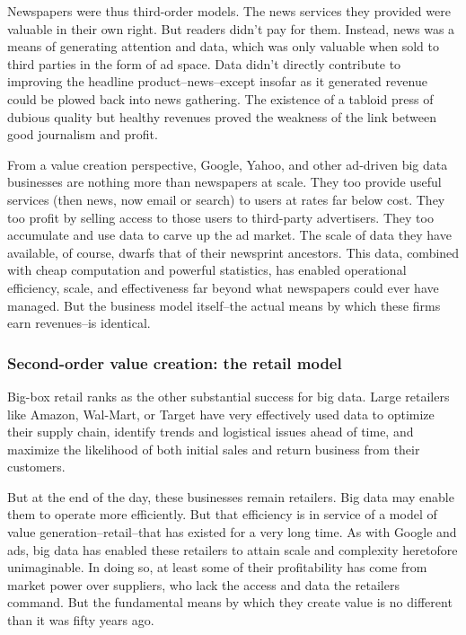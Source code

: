 \documentclass[12pt]{article}
\begin{document}
Newspapers were thus third-order models. The news services they
provided were valuable in their own right. But readers didn't pay for
them. Instead, news was a means of generating attention and data,
which was only valuable when sold to third parties in the form of ad
space. Data didn't directly contribute to improving the headline
product--news--except insofar as it generated revenue could be plowed
back into news gathering. The existence of a tabloid press of dubious
quality but healthy revenues proved the weakness of the link between
good journalism and profit.

From a value creation perspective, Google, Yahoo, and other ad-driven
big data businesses are nothing more than newspapers at scale. They
too provide useful services (then news, now email or search) to users
at rates far below cost. They too profit by selling access to those
users to third-party advertisers. They too accumulate and use data to
carve up the ad market. The scale of data they have available, of
course, dwarfs that of their newsprint ancestors. This data, combined
with cheap computation and powerful statistics, has enabled
operational efficiency, scale, and effectiveness far beyond what
newspapers could ever have managed. But the business model
itself--the actual means by which these firms earn revenues--is
identical.

\subsubsection{Second-order value creation: the retail model}
\label{sec:second-order-value}


Big-box retail ranks as the other substantial success for big
data. Large retailers like Amazon, Wal-Mart, or Target have very
effectively used data to optimize their supply chain, identify trends
and logistical issues ahead of time, and maximize the likelihood of
both initial sales and return business from their customers. 

But at the end of the day, these businesses remain retailers. Big data
may enable them to operate more efficiently. But that efficiency is in
service of a model of value generation--retail--that has existed for a
very long time. As with Google and ads, big data has enabled these
retailers to attain scale and complexity heretofore unimaginable. In
doing so, at least some of their profitability has come from market
power over suppliers, who lack the access and data the retailers
command. But the fundamental means by which they create value is no
different than it was fifty years ago.
\end{document}
